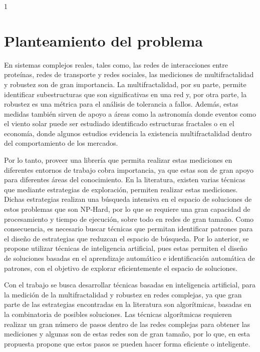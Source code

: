 1\section{Planteamiento del problema}
En sistemas complejos reales, tales como, las redes de interacciones entre proteínas, redes de transporte y redes sociales, las mediciones de multifractalidad y robustez son de gran importancia. La multifractalidad, por su parte, permite identificar subestructuras que son significativas en una red\cite{Shuhei2011} y, por otra parte, la robustez es una métrica para el análisis de tolerancia a fallos\cite{Martin-Hernandez2013}. Además, estas medidas también sirven de apoyo a áreas como la astronomía donde eventos como el viento solar puede ser estudiado identificado estructuras fractales\cite{Macek2007} o en el economía, donde algunos estudios evidencia la existencia multifractalidad dentro del comportamiento de los mercados\cite{Caraiani2012}.

Por lo tanto, proveer una librería que permita realizar estas mediciones en diferentes entornos de trabajo cobra importancia, ya que estas son de gran apoyo para diferentes áreas del conocimiento. En la literatura, existen varias técnicas que mediante estrategias de exploración, permiten realizar estas mediciones. Dichas estrategias realizan una búsqueda intensiva en el espacio de soluciones de estos problemas que son NP-Hard, por lo que se requiere una gran capacidad de procesamiento y tiempo de ejecución, sobre todo en redes de gran tamaño. Como consecuencia, es necesario buscar técnicas que permitan identificar patrones para el diseño de estrategias que reduzcan el espacio de búsqueda. Por lo anterior, se propone utilizar técnicas de inteligencia artificial, pues estas permiten el diseño de soluciones basadas en el aprendizaje automático e identificación automática de patrones, con el objetivo de explorar eficientemente el espacio de soluciones.

Con el trabajo se busca desarrollar técnicas basadas en inteligencia artificial, para la medición de la multifractalidad y robustez en redes complejas, ya que gran parte de las estrategias encontradas en la literatura son algorítmicas, basadas en la combinatoria de posibles soluciones. Las técnicas algorítmicas requieren realizar un gran número de pasos dentro de las redes complejas para obtener las mediciones y algunas son de estas redes son de gran tamaño, por lo que, en esta propuesta propone que estos pasos se pueden hacer forma eficiente o inteligente.


